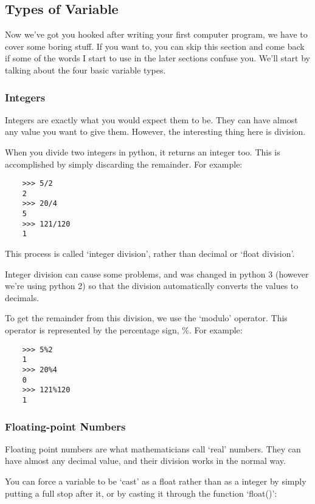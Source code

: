\subsection{Types of Variable}

Now we've got you hooked after writing your first computer program, we have to
cover some boring stuff. If you want to, you can skip this section and come back
if some of the words I start to use in the later sections confuse you. We'll
start by talking about the four basic variable types.

\subsubsection{Integers}

Integers are exactly what you would expect them to be. They can have almost any
value you want to give them. However, the interesting thing here is division.

When you divide two integers in python, it returns an integer too. This is
accomplished by simply discarding the remainder. For example:

\begin{lstlisting}
    >>> 5/2
    2
    >>> 20/4
    5
    >>> 121/120
    1
\end{lstlisting}

This process is called `integer division', rather than decimal or `float
division'.

Integer division can cause some problems, and was changed in python 3 (however
we're using python 2) so that the division automatically converts the values to
decimals.

To get the remainder from this division, we use the `modulo' operator. This
operator is represented by the percentage sign, \%. For example:

\begin{lstlisting}
    >>> 5%2
    1
    >>> 20%4
    0
    >>> 121%120
    1
\end{lstlisting}

\subsubsection{Floating-point Numbers}

Floating point numbers are what mathematicians call `real' numbers. They can
have almost any decimal value, and their division works in the normal way.

You can force a variable to be `cast' as a float rather than as a integer by
simply putting a full stop after it, or by casting it through the function
`float()':

